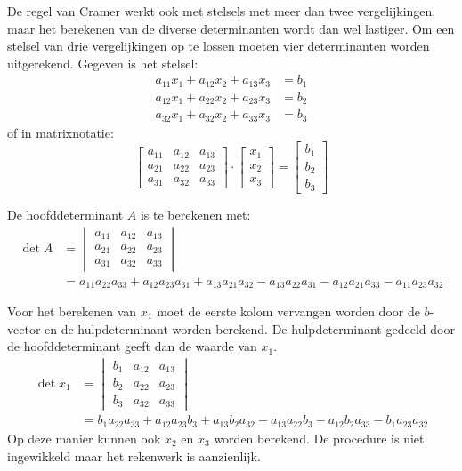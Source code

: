 De regel van Cramer werkt ook met stelsels met meer dan twee vergelijkingen, maar het berekenen van de diverse determinanten wordt dan wel lastiger. Om een stelsel van drie vergelijkingen op te lossen moeten vier determinanten worden uitgerekend. Gegeven is het stelsel:
%
\begin{equation}
\begin{split}
a_{11}x_1 + a_{12}x_2 + a_{13}x_3 &= b_1 \\
a_{12}x_1 + a_{22}x_2 + a_{23}x_3 &= b_2 \\
a_{32}x_1 + a_{32}x_2 + a_{33}x_3 &= b_3
\end{split}
\end{equation}
%
of in matrixnotatie:
%
\begin{equation}
\begin{bmatrix}
a_{11} & a_{12} & a_{13} \\
a_{21} & a_{22} & a_{23} \\
a_{31} & a_{32} & a_{33}
\end{bmatrix} \cdot
\begin{bmatrix}
x_1 \\
x_2 \\
x_3
\end{bmatrix} =
\begin{bmatrix}
b_1 \\
b_2 \\
b_3
\end{bmatrix}
\end{equation}

De hoofddeterminant $A$ is te berekenen met:
%
\begin{equation}
\begin{split}
\det A &= \begin{vmatrix}
a_{11} & a_{12} & a_{13} \\
a_{21} & a_{22} & a_{23} \\
a_{31} & a_{32} & a_{33}
\end{vmatrix} \\&=
 a_{11}a_{22}a_{33}+a_{12}a_{23}a_{31}+a_{13}a_{21}a_{32} - a_{13}a_{22}a_{31} -a_{12}a_{21}a_{33} - a_{11}a_{23}a_{32}
\end{split}
\end{equation}

Voor het berekenen van $x_1$ moet de eerste kolom vervangen worden door de $b$-vector en de hulpdeterminant worden berekend. De hulpdeterminant gedeeld door de hoofddeterminant geeft dan de waarde van $x_1$.
%
\begin{equation}
\begin{split}
\det x_1 &= \begin{vmatrix}
b_{1} & a_{12} & a_{13} \\
b_{2} & a_{22} & a_{23} \\
b_{3} & a_{32} & a_{33}
\end{vmatrix} \\&=
 b_{1}a_{22}a_{33}+a_{12}a_{23}b_{3}+a_{13}b_{2}a_{32} - a_{13}a_{22}b_{3} -a_{12}b_{2}a_{33} - b_{1}a_{23}a_{32}
\end{split}
\end{equation}
%
Op deze manier kunnen ook $x_2$ en $x_3$ worden berekend. De procedure is niet ingewikkeld maar het rekenwerk is aanzienlijk.

